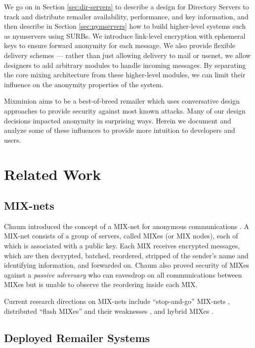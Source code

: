 \documentclass{llncs}
\begin{document}
We go on in Section \ref{sec:dir-servers} to describe a design for
Directory Servers to track and distribute remailer availability,
performance, and key information, and then describe in Section
\ref{sec:nymservers} how to build higher-level systems such as nymservers
using SURBs. We introduce link-level encryption with ephemeral keys to
ensure forward anonymity for each message. We also provide flexible
delivery schemes --- rather than just allowing delivery to mail or
usenet, we allow designers to add arbitrary modules to handle incoming
messages. By separating the core mixing architecture from these
higher-level modules, we can limit their influence on the anonymity
properties of the system.

Mixminion aims to be a best-of-breed remailer which uses conversative
design approaches to provide security against most known attacks.
Many of our design decisions impacted anonymity in surprising ways. Herein
we document and analyze some of these influences to provide more intuition
to developers and users.


\section{Related Work}

\subsection{MIX-nets}

Chaum introduced the concept of a MIX-net for anonymous communications
\cite{chaum-mix}. A MIX-net consists of a group of servers, called MIXes
(or MIX nodes), each of which is associated with a public key. Each
MIX receives encrypted messages, which are then decrypted, batched,
reordered, stripped of the sender's name and identifying information, and
forwarded on. Chaum also proved security of MIXes against a \emph{passive
adversary} who can eavesdrop on all communications between MIXes but is
unable to observe the reordering inside each MIX.

Current research directions on MIX-nets include ``stop-and-go'' MIX-nets
\cite{kesdogan}, distributed ``flash MIXes'' \cite{flash-mix} and their
weaknesses \cite{desmedt,mitkuro}, and hybrid MIXes \cite{hybrid-mix}.

\subsection{Deployed Remailer Systems}
\end{document}
